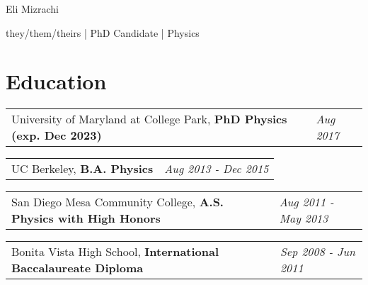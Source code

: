\documentclass[
  10pt,
  letterpaper,
  DIV=11,
  numbers=noendperiod]{scrartcl}
\author{}
\date{}
\begin{document}
\ifdefined\Shaded\renewenvironment{Shaded}{\begin{tcolorbox}[borderline west={3pt}{0pt}{shadecolor}, boxrule=0pt, enhanced, sharp corners, breakable, frame hidden, interior hidden]}{\end{tcolorbox}}\fi

\begin{center}

\begin{LARGE}Eli Mizrachi\end{LARGE}

\begin{small}they/them/theirs | PhD Candidate | Physics\end{small}

\href{mailto:emiz@umd.edu}{}
\href{https://e-miz.github.io}{}

\end{center}

\hypertarget{fa-user-graduate-education}{%
\section{\texorpdfstring{
Education}{ Education}}\label{fa-user-graduate-education}}

\begin{tabularx}{\textwidth}{>{\RaggedRight}p{}  >{\RaggedLeft}X} University of Maryland at College Park, \textbf{PhD Physics (exp. Dec 2023)} & \textcolor{mygray}{\textit{Aug 2017}}  \end{tabularx}

\begin{tabularx}{\textwidth}{>{\RaggedRight}p{}  >{\RaggedLeft}X} UC Berkeley, \textbf{B.A. Physics} & \textcolor{mygray}{\textit{Aug 2013 - Dec 2015}}  \end{tabularx}

\begin{tabularx}{\textwidth}{>{\RaggedRight}p{}  >{\RaggedLeft}X} San Diego Mesa Community College, \textbf{A.S. Physics with High Honors} & \textcolor{mygray}{\textit{Aug 2011 - May 2013}}  \end{tabularx}

\begin{tabularx}{\textwidth}{>{\RaggedRight}p{}  >{\RaggedLeft}X} Bonita Vista High School, \textbf{International Baccalaureate Diploma} & \textcolor{mygray}{\textit{Sep 2008 - Jun 2011}}  \end{tabularx}
\end{document}
